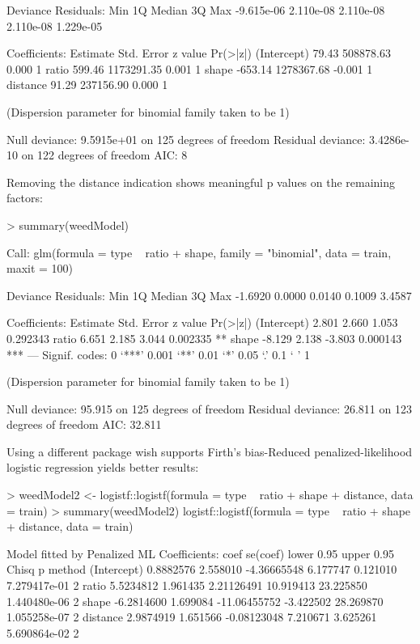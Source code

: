 \documentclass[letterpaper]{article}
\begin{document}
Deviance Residuals: 
       Min          1Q      Median          3Q         Max  
-9.615e-06   2.110e-08   2.110e-08   2.110e-08   1.229e-05  

Coefficients:
              Estimate Std. Error z value Pr(>|z|)
(Intercept)      79.43  508878.63   0.000        1
ratio           599.46 1173291.35   0.001        1
shape          -653.14 1278367.68  -0.001        1
distance         91.29  237156.90   0.000        1

(Dispersion parameter for binomial family taken to be 1)

    Null deviance: 9.5915e+01  on 125  degrees of freedom
Residual deviance: 3.4286e-10  on 122  degrees of freedom
AIC: 8


Removing the distance indication shows meaningful p values on the remaining factors:

> summary(weedModel)

Call:
glm(formula = type ~ ratio + shape, family = "binomial", data = train, 
    maxit = 100)

Deviance Residuals: 
    Min       1Q   Median       3Q      Max  
-1.6920   0.0000   0.0140   0.1009   3.4587  

Coefficients:
            Estimate Std. Error z value Pr(>|z|)    
(Intercept)    2.801      2.660   1.053 0.292343    
ratio          6.651      2.185   3.044 0.002335 ** 
shape         -8.129      2.138  -3.803 0.000143 ***
---
Signif. codes:  0 ‘***’ 0.001 ‘**’ 0.01 ‘*’ 0.05 ‘.’ 0.1 ‘ ’ 1

(Dispersion parameter for binomial family taken to be 1)

    Null deviance: 95.915  on 125  degrees of freedom
Residual deviance: 26.811  on 123  degrees of freedom
AIC: 32.811

Using a different package wish supports Firth's bias-Reduced penalized-likelihood logistic regression yields better results:

> weedModel2 <- logistf::logistf(formula = type ~ ratio + shape + distance, data = train)
> summary(weedModel2)
logistf::logistf(formula = type ~ ratio + shape + distance, data = train)

Model fitted by Penalized ML
Coefficients:
                  coef se(coef)   lower 0.95 upper 0.95     Chisq            p method
(Intercept)  0.8882576 2.558010  -4.36665548   6.177747  0.121010 7.279417e-01      2
ratio        5.5234812 1.961435   2.21126491  10.919413 23.225850 1.440480e-06      2
shape       -6.2814600 1.699084 -11.06455752  -3.422502 28.269870 1.055258e-07      2
distance     2.9874919 1.651566  -0.08123048   7.210671  3.625261 5.690864e-02      2
\end{document}
